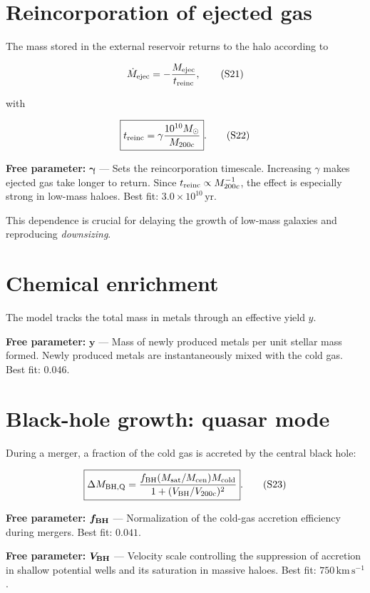 \documentclass[11pt,a4paper]{article}
\newcommand{\freeparam}[2]{%
  \colorbox{freeblue}{\parbox{0.95\linewidth}{\textbf{Free parameter:} $\boldsymbol{#1}$ --- #2}}%
}
\begin{document}
\section{Reincorporation of ejected gas}
The mass stored in the external reservoir returns to the halo according to

\begin{equation}
 \dot M_{\rm ejec}=-\frac{M_{\rm ejec}}{t_{\rm reinc}},
 \tag{S21}
\end{equation}

with

\begin{equation}
 \boxed{t_{\rm reinc}=\gamma\frac{10^{10}M_\odot}{M_{200c}}}.
 \tag{S22}
\end{equation}

\freeparam{\gamma}{Sets the reincorporation timescale. Increasing $\gamma$ makes ejected gas take longer to return. Since $t_{\rm reinc}\propto M_{200c}^{-1}$, the effect is especially strong in low-mass haloes. Best fit: $3.0\times10^{10}\,\mathrm{yr}$.}

This dependence is crucial for delaying the growth of low-mass galaxies and reproducing \textit{downsizing}.

\section{Chemical enrichment}
The model tracks the total mass in metals through an effective yield $y$.

\freeparam{y}{Mass of newly produced metals per unit stellar mass formed. Newly produced metals are instantaneously mixed with the cold gas. Best fit: $0.046$.}

\section{Black-hole growth: quasar mode}
During a merger, a fraction of the cold gas is accreted by the central black hole:

\begin{equation}
 \boxed{\Delta M_{\rm BH,Q}=
 \frac{f_{\rm BH}(M_{\rm sat}/M_{\rm cen})M_{\rm cold}}
 {1+(V_{\rm BH}/V_{200c})^2}}.
 \tag{S23}
\end{equation}

\freeparam{f_{\rm BH}}{Normalization of the cold-gas accretion efficiency during mergers. Best fit: $0.041$.}

\freeparam{V_{\rm BH}}{Velocity scale controlling the suppression of accretion in shallow potential wells and its saturation in massive haloes. Best fit: $750\,\mathrm{km\,s^{-1}}$.}
\end{document}
